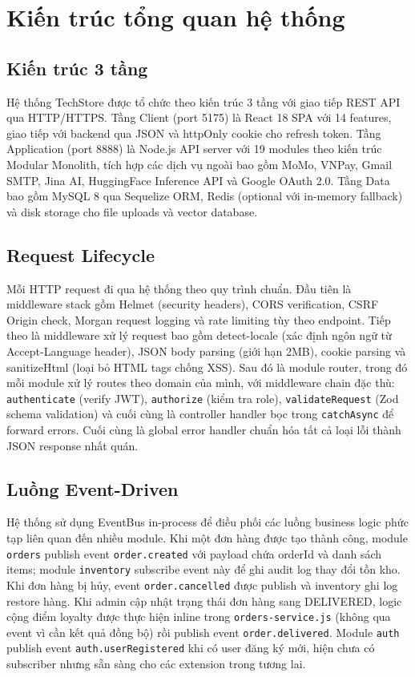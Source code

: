 \section{Kiến trúc tổng quan hệ thống}

\subsection{Kiến trúc 3 tầng}

Hệ thống TechStore được tổ chức theo kiến trúc 3 tầng với giao tiếp REST API qua HTTP/HTTPS. Tầng Client (port 5175) là React 18 SPA với 14 features, giao tiếp với backend qua JSON và httpOnly cookie cho refresh token. Tầng Application (port 8888) là Node.js API server với 19 modules theo kiến trúc Modular Monolith, tích hợp các dịch vụ ngoài bao gồm MoMo, VNPay, Gmail SMTP, Jina AI, HuggingFace Inference API và Google OAuth 2.0. Tầng Data bao gồm MySQL 8 qua Sequelize ORM, Redis (optional với in-memory fallback) và disk storage cho file uploads và vector database.

\subsection{Request Lifecycle}

Mỗi HTTP request đi qua hệ thống theo quy trình chuẩn. Đầu tiên là middleware stack gồm Helmet (security headers), CORS verification, CSRF Origin check, Morgan request logging và rate limiting tùy theo endpoint. Tiếp theo là middleware xử lý request bao gồm detect-locale (xác định ngôn ngữ từ Accept-Language header), JSON body parsing (giới hạn 2MB), cookie parsing và sanitizeHtml (loại bỏ HTML tags chống XSS). Sau đó là module router, trong đó mỗi module xử lý routes theo domain của mình, với middleware chain đặc thù: \texttt{authenticate} (verify JWT), \texttt{authorize} (kiểm tra role), \texttt{validateRequest} (Zod schema validation) và cuối cùng là controller handler bọc trong \texttt{catchAsync} để forward errors. Cuối cùng là global error handler chuẩn hóa tất cả loại lỗi thành JSON response nhất quán.

\subsection{Luồng Event-Driven}

Hệ thống sử dụng EventBus in-process để điều phối các luồng business logic phức tạp liên quan đến nhiều module. Khi một đơn hàng được tạo thành công, module \texttt{orders} publish event \texttt{order.created} với payload chứa orderId và danh sách items; module \texttt{inventory} subscribe event này để ghi audit log thay đổi tồn kho. Khi đơn hàng bị hủy, event \texttt{order.cancelled} được publish và inventory ghi log restore hàng. Khi admin cập nhật trạng thái đơn hàng sang DELIVERED, logic cộng điểm loyalty được thực hiện inline trong \texttt{orders-service.js} (không qua event vì cần kết quả đồng bộ) rồi publish event \texttt{order.delivered}. Module \texttt{auth} publish event \texttt{auth.userRegistered} khi có user đăng ký mới, hiện chưa có subscriber nhưng sẵn sàng cho các extension trong tương lai.

